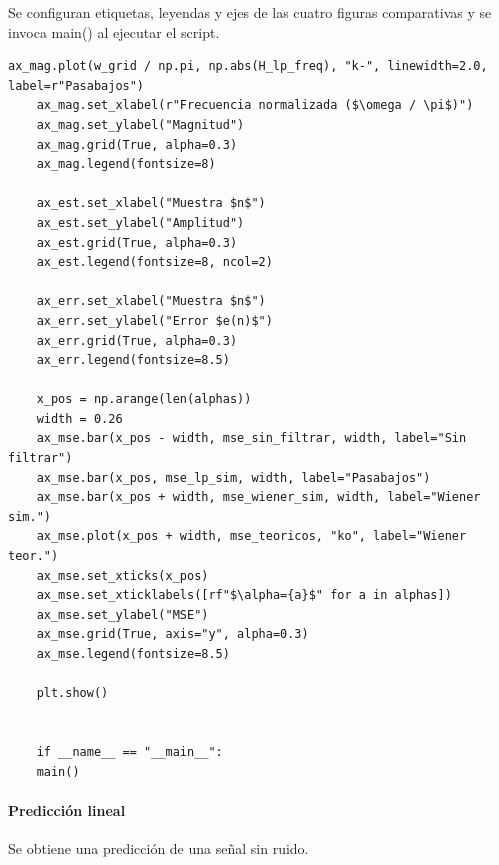 \documentclass[a4paper]{article}
\begin{document}
 Se configuran etiquetas, leyendas y ejes de las cuatro figuras comparativas y se invoca main() al ejecutar el script.
 \begin{lstlisting}[caption={Formato de gráficas y punto de entrada del script.}, label={lst:main_plots}]
 	ax_mag.plot(w_grid / np.pi, np.abs(H_lp_freq), "k-", linewidth=2.0, label=r"Pasabajos")
 	ax_mag.set_xlabel(r"Frecuencia normalizada ($\omega / \pi$)")
 	ax_mag.set_ylabel("Magnitud")
 	ax_mag.grid(True, alpha=0.3)
 	ax_mag.legend(fontsize=8)
 	
 	ax_est.set_xlabel("Muestra $n$")
 	ax_est.set_ylabel("Amplitud")
 	ax_est.grid(True, alpha=0.3)
 	ax_est.legend(fontsize=8, ncol=2)
 	
 	ax_err.set_xlabel("Muestra $n$")
 	ax_err.set_ylabel("Error $e(n)$")
 	ax_err.grid(True, alpha=0.3)
 	ax_err.legend(fontsize=8.5)
 	
 	x_pos = np.arange(len(alphas))
 	width = 0.26
 	ax_mse.bar(x_pos - width, mse_sin_filtrar, width, label="Sin filtrar")
 	ax_mse.bar(x_pos, mse_lp_sim, width, label="Pasabajos")
 	ax_mse.bar(x_pos + width, mse_wiener_sim, width, label="Wiener sim.")
 	ax_mse.plot(x_pos + width, mse_teoricos, "ko", label="Wiener teor.")
 	ax_mse.set_xticks(x_pos)
 	ax_mse.set_xticklabels([rf"$\alpha={a}$" for a in alphas])
 	ax_mse.set_ylabel("MSE")
 	ax_mse.grid(True, axis="y", alpha=0.3)
 	ax_mse.legend(fontsize=8.5)
 	
 	plt.show()
 	
 	
 	if __name__ == "__main__":
 	main()
 \end{lstlisting} 
\vspace{1cm}

 
 \paragraph{Predicción lineal}
 
 Se obtiene una predicción de una señal sin ruido.
 
\end{document}
